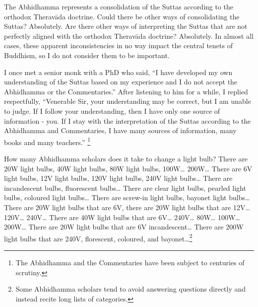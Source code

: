 \color{black}


The Abhidhamma represents a consolidation of the Suttas according to the orthodox Theravāda doctrine. Could there be other ways of consolidating the Suttas? Absolutely. Are there other ways of interpreting the Suttas that are not perfectly aligned with the orthodox Theravāda doctrine? Absolutely. In almost all cases, these apparent inconsistencies in no way impact the central tenets of Buddhism, so I do not consider them to be important.

I once met a senior monk with a PhD who said, “I have developed my own understanding of the Suttas based on my experience and I do not accept the Abhidhamma or the Commentaries.” After listening to him for a while, I replied respectfully, “Venerable Sir, your understanding may be correct, but I am unable to judge. If I follow your understanding, then I have only one source of information - you. If I stay with the interpretation of the Suttas according to the Abhidhamma and Commentaries, I have many sources of information, many books and many teachers.” \footnote{The Abhidhamma and the Commentaries have been subject to centuries of scrutiny.}


How many Abhidhamma scholars does it take to change a light bulb? There are 20W light bulbs, 40W light bulbs, 80W light bulbs, 100W… 200W… There are 6V light bulbs, 12V light bulbs, 120V light bulbs, 240V light bulbs… There are incandescent bulbs, fluorescent bulbs… There are clear light bulbs, pearled light bulbs, coloured light bulbs… There are screw-in light bulbs, bayonet light bulbs… There are 20W light bulbs that are 6V, there are 20W light bulbs that are 12V… 120V… 240V… There are 40W light bulbs that are 6V… 240V… 80W… 100W… 200W… There are 20W light bulbs that are 6V incandescent… There are 200W light bulbs that are 240V, florescent, coloured, and bayonet…\footnote{Some Abhidhamma scholars tend to avoid answering questions directly and instead recite long lists of categories.}
